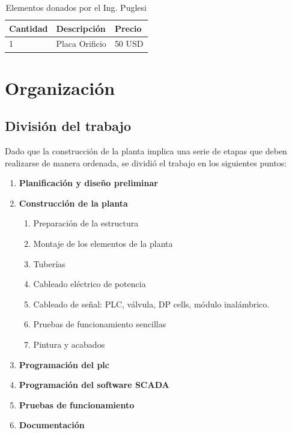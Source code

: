 \begin{table}[!t]
\renewcommand{\arraystretch}{1.4}
\centering
\begin{tabularx}{\textwidth}{l||X||l}
\hline
\bfseries Cantidad & \bfseries Descripción & \bfseries Precio\\
\hline \hline
1& Placa Orificio& 50 USD\\
\hline
\end{tabularx}
\caption{Elementos donados por el Ing. Puglesi}
\label{tab:donacionPuglesi}
\end{table}

\section{Organización}
\label{sec:Organizacion}
\subsection{División del trabajo}
Dado que la construcción de la planta implica una serie de etapas que
deben realizarse de manera ordenada, se dividió el trabajo en los siguientes
puntos:
\begin{enumerate}
 \item \textbf{Planificación y diseño preliminar}
  \item \textbf{Construcción de la planta}
  \begin{enumerate}
   \item Preparación de la estructura
   \item Montaje de los elementos de la planta
   \item Tuberías
   \item Cableado eléctrico de potencia
   \item Cableado de señal: PLC, válvula, DP cells, módulo inalámbrico.
   \item Pruebas de funcionamiento sencillas
   \item Pintura y acabados
  \end{enumerate}
  \item \textbf{Programación del \gls{plc}}
  \item \textbf{Programación del software SCADA}
  \item \textbf{Pruebas de funcionamiento}
  \item \textbf{Documentación}
\end{enumerate}

